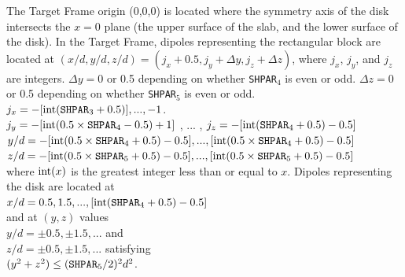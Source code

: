 	    The Target Frame origin (0,0,0) is located where the symmetry
	    axis of the disk intersects the $x=0$ plane (the upper surface
	    of the slab, and the lower surface of the disk).
	    In the Target Frame, 
	    dipoles representing the rectangular block are located at
	    $(x/d,y/d,z/d)=(j_x+0.5,j_y+\Delta y,j_z+\Delta z)$, where
	    $j_x$, $j_y$, and $j_z$ are integers. $\Delta y=0$ or 0.5
	    depending on whether {\tt SHPAR}$_4$ is even or odd.
	    $\Delta z=0$ or 0.5 depending on whether {\tt SHPAR}$_5$ is
	    even or odd.\\
	    
	    $j_x = -[{\rm int}({\tt SHPAR}_3+0.5)] , ... , -1$.
	     \\
	    
	    $j_y = -[{\rm int}(0.5\times{\tt SHPAR}_4-0.5) + 1]$ , ... ,
            $j_z = -[{\rm int}({\tt SHPAR}_4+0.5)-0.5]$\\
	    
	    $y/d = -[{\rm int}(0.5\times{\tt SHPAR}_4+0.5)-0.5] , ... , 
                    [{\rm int}(0.5\times{\tt SHPAR}_4+0.5)-0.5]$\\
            
	    $z/d =  -[{\rm int}(0.5\times{\tt SHPAR}_5+0.5)-0.5] , ... , 
                     [{\rm int}(0.5\times{\tt SHPAR}_5+0.5)-0.5]$\\
            where ${\rm int}(x)$ is the greatest integer less than or equal
	    to $x$.
            Dipoles representing the disk are located at\\
	    $x/d = 0.5 , 1.5 ,..., 
	    [{\rm int}({\tt SHPAR}_4+0.5)-0.5]$\\
	    and at $(y,z)$ values \\
	    $y/d = \pm 0.5, \pm 1.5, ...$ and\\
	    $z/d = \pm 0.5, \pm 1.5, ...$ satisfying\\
	    $(y^2+z^2) \leq ({\tt SHPAR}_5/2)^2 d^2$.
	    
